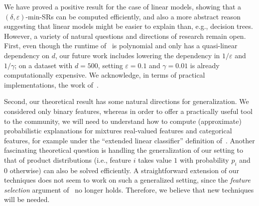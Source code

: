 We have proved a positive result for the case of linear models, showing that a $(\delta, \varepsilon)$-min-SRs can be computed efficiently, and also a more abstract reason suggesting that linear models might be easier to explain than, e.g., decision trees. However,  a variety of natural questions and directions of research remain open. First, even though the runtime of~ is polynomial and only has a quasi-linear dependency on $d$, our future work includes lowering the dependency in $1/\varepsilon$ and $1/\gamma$; on a dataset with $d = 500$, setting $\varepsilon = 0.1$ and $\gamma = 0.01$ is already computationally expensive. We acknowledge, in terms of practical implementations, the work of~\citet{Louenas,izza2024locallyminimalprobabilisticexplanations,izzaComputingProbabilisticAbductive2023}. 

Second, our theoretical result has some natural directions for generalization. We considered only binary features, whereas in order to offer a practically useful tool to the community, we will need to understand how to compute (approximate) probabilistic explanations for mixtures real-valued features and categorical features, for example under the ``extended linear classifier'' definition of~\citet{DBLP:conf/nips/0001GCIN20}.  Another fascinating theoretical question is handling the generalization of our setting to that of product distributions (i.e., feature $i$ takes value $1$ with probability $p_i$ and $0$ otherwise) can also be solved efficiently. A straightforward extension of our techniques does not seem to work on such a generalized setting, since the \emph{feature selection} argument of~ no longer holds. Therefore, we believe that new techniques will be needed.  
 
